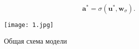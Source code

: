 \documentclass[12pt,twoside]{article}
\newcommand{\ba}{\mathbf{a}}
\newcommand{\bu}{\mathbf{u}}
\newcommand{\bw}{\mathbf{w}}
\begin{document}
\[
	\ba^* = \sigma(\bu^*, \bw_\sigma).
\]
\begin{figure}[h!]
	\centering
	\texttt{[image: 1.jpg]}
	\caption{Общая схема модели}
\end{figure}










\end{document}
